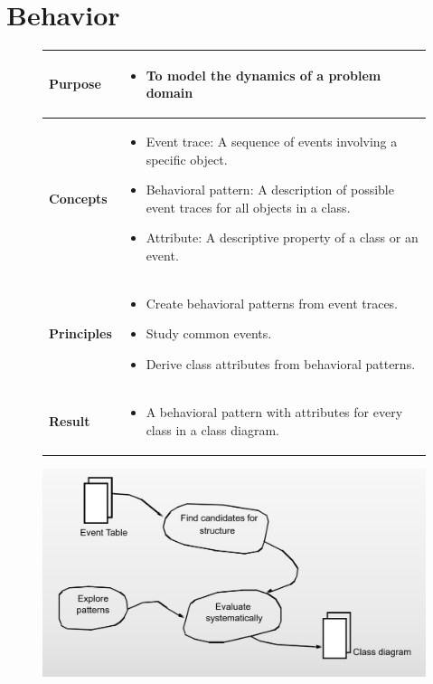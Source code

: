 \chapter{Behavior \ooad[91]}\label{chapter:behavior}
\begin{figure}[H]
    \begin{tabular}{|l|p{12cm}|}
        \hline
        \textbf{Purpose} & \begin{itemize}
            \item To model the dynamics of a problem domain
        \end{itemize} \\\hline
        \textbf{Concepts} & \begin{itemize}
            \item Event trace: A sequence of events involving a specific object.
            \item Behavioral pattern: A description of possible event traces for all objects in a class.
            \item Attribute: A descriptive property of a class or an event.
        \end{itemize} \\\hline
        \textbf{Principles} & \begin{itemize}
            \item Create behavioral patterns from event traces.
            \item Study common events.
            \item Derive class attributes from behavioral patterns.
        \end{itemize} \\\hline
        \textbf{Result} & \begin{itemize}
            \item A behavioral pattern with attributes for every class in a class diagram.
        \end{itemize} \\\hline
    \end{tabular}
\end{figure}

\begin{figure}[H]
    \centering
    \includegraphics*[width=\linewidth]{chapters/behavior/figures/structure_activity.png}
\end{figure}

